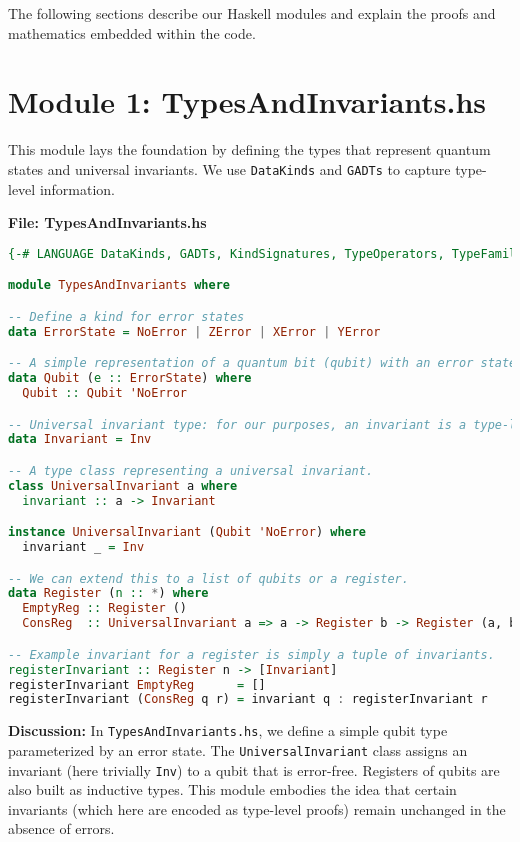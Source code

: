\documentclass[12pt]{article}
\begin{document}
The following sections describe our Haskell modules and explain the proofs and mathematics embedded within the code.

\newpage

\section{Module 1: TypesAndInvariants.hs}

This module lays the foundation by defining the types that represent quantum states and universal invariants. We use \texttt{DataKinds} and \texttt{GADTs} to capture type-level information.

\bigskip

\noindent\textbf{File: TypesAndInvariants.hs}
\begin{lstlisting}[language=Haskell, caption={TypesAndInvariants.hs}]
{-# LANGUAGE DataKinds, GADTs, KindSignatures, TypeOperators, TypeFamilies #-}

module TypesAndInvariants where

-- Define a kind for error states
data ErrorState = NoError | ZError | XError | YError

-- A simple representation of a quantum bit (qubit) with an error state.
data Qubit (e :: ErrorState) where
  Qubit :: Qubit 'NoError

-- Universal invariant type: for our purposes, an invariant is a type-level marker
data Invariant = Inv

-- A type class representing a universal invariant.
class UniversalInvariant a where
  invariant :: a -> Invariant

instance UniversalInvariant (Qubit 'NoError) where
  invariant _ = Inv

-- We can extend this to a list of qubits or a register.
data Register (n :: *) where
  EmptyReg :: Register ()
  ConsReg  :: UniversalInvariant a => a -> Register b -> Register (a, b)

-- Example invariant for a register is simply a tuple of invariants.
registerInvariant :: Register n -> [Invariant]
registerInvariant EmptyReg      = []
registerInvariant (ConsReg q r) = invariant q : registerInvariant r
\end{lstlisting}

\bigskip

\noindent\textbf{Discussion:}  
In \texttt{TypesAndInvariants.hs}, we define a simple qubit type parameterized by an error state. The \texttt{UniversalInvariant} class assigns an invariant (here trivially \texttt{Inv}) to a qubit that is error-free. Registers of qubits are also built as inductive types. This module embodies the idea that certain invariants (which here are encoded as type-level proofs) remain unchanged in the absence of errors.
\end{document}
